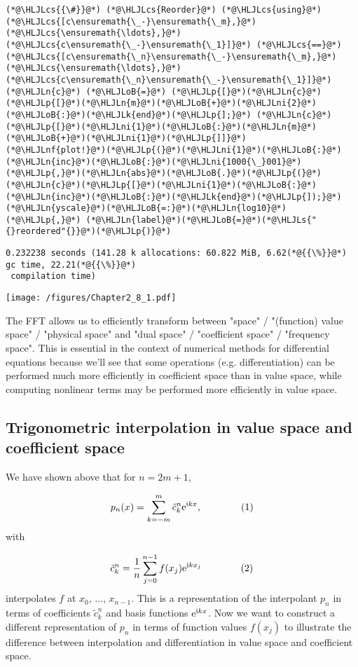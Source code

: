 \documentclass[12pt,a4paper]{article}
\newcommand{\HLJLk}[1]{\textcolor[RGB]{148,91,176}{\textbf{#1}}}
\newcommand{\HLJLn}[1]{#1}
\newcommand{\HLJLnf}[1]{\textcolor[RGB]{66,102,213}{#1}}
\newcommand{\HLJLs}[1]{\textcolor[RGB]{201,61,57}{#1}}
\newcommand{\HLJLni}[1]{\textcolor[RGB]{59,151,46}{#1}}
\newcommand{\HLJLoB}[1]{\textcolor[RGB]{102,102,102}{\textbf{#1}}}
\newcommand{\HLJLp}[1]{#1}
\newcommand{\HLJLcs}[1]{\textcolor[RGB]{153,153,119}{\textit{#1}}}
\begin{document}
\begin{lstlisting}
(*@\HLJLcs{{\#}}@*) (*@\HLJLcs{Reorder}@*) (*@\HLJLcs{using}@*) (*@\HLJLcs{[c\ensuremath{\_-}\ensuremath{\_m},}@*) (*@\HLJLcs{\ensuremath{\ldots},}@*) (*@\HLJLcs{c\ensuremath{\_-}\ensuremath{\_1}]}@*) (*@\HLJLcs{==}@*) (*@\HLJLcs{[c\ensuremath{\_n}\ensuremath{\_-}\ensuremath{\_m},}@*) (*@\HLJLcs{\ensuremath{\ldots},}@*) (*@\HLJLcs{c\ensuremath{\_n}\ensuremath{\_-}\ensuremath{\_1}]}@*)
(*@\HLJLn{c}@*) (*@\HLJLoB{=}@*) (*@\HLJLp{[}@*)(*@\HLJLn{c}@*)(*@\HLJLp{[}@*)(*@\HLJLn{m}@*)(*@\HLJLoB{+}@*)(*@\HLJLni{2}@*)(*@\HLJLoB{:}@*)(*@\HLJLk{end}@*)(*@\HLJLp{];}@*) (*@\HLJLn{c}@*)(*@\HLJLp{[}@*)(*@\HLJLni{1}@*)(*@\HLJLoB{:}@*)(*@\HLJLn{m}@*)(*@\HLJLoB{+}@*)(*@\HLJLni{1}@*)(*@\HLJLp{]]}@*)
(*@\HLJLnf{plot!}@*)(*@\HLJLp{(}@*)(*@\HLJLni{1}@*)(*@\HLJLoB{:}@*)(*@\HLJLn{inc}@*)(*@\HLJLoB{:}@*)(*@\HLJLni{1000{\_}001}@*)(*@\HLJLp{,}@*)(*@\HLJLn{abs}@*)(*@\HLJLoB{.}@*)(*@\HLJLp{(}@*)(*@\HLJLn{c}@*)(*@\HLJLp{[}@*)(*@\HLJLni{1}@*)(*@\HLJLoB{:}@*)(*@\HLJLn{inc}@*)(*@\HLJLoB{:}@*)(*@\HLJLk{end}@*)(*@\HLJLp{]);}@*) (*@\HLJLn{yscale}@*)(*@\HLJLoB{=:}@*)(*@\HLJLn{log10}@*)(*@\HLJLp{,}@*) (*@\HLJLn{label}@*)(*@\HLJLoB{=}@*)(*@\HLJLs{"{}reordered"{}}@*)(*@\HLJLp{)}@*)
\end{lstlisting}

\begin{lstlisting}
0.232238 seconds (141.28 k allocations: 60.822 MiB, 6.62(*@{{\%}}@*) gc time, 22.21(*@{{\%}}@*)
 compilation time)
\end{lstlisting}

\texttt{[image: /figures/Chapter2\_8\_1.pdf]}

The FFT allows us to efficiently transform between "space" / "(function) value space" / "physical space" and "dual space" / "coefficient space" / "frequency space".  This is essential in the context of numerical methods for differential equations because we'll see that some operations (e.g. differentiation) can be performed much more efficiently in coefficient space than in value space, while computing nonlinear terms may be performed more efficiently in value space.   

\subsection{Trigonometric interpolation in value space and coefficient space}
We have shown above that for $n = 2m+1$,

\[
p_n(x) = \sum_{k=-m}^{m} \tilde{c}^n_k{\rm e}^{{\rm i}kx},  \qquad \qquad (1)
\]
with

\[
\tilde{c}^n_k = \frac{1}{n}\sum_{j=0}^{n-1}f(x_j){\rm e}^{{\rm i}kx_j}  \qquad  \qquad (2)
\]
interpolates $f$ at $x_0$, $\ldots$, $x_{n-1}$. This is a representation of the interpolant $p_n$ in terms of coefficients $\tilde{c}^n_k$ and basis functions ${\rm e}^{{\rm i}kx}$.   Now we want to construct a different representation of $p_n$ in terms of function values $f(x_j)$ to illustrate the difference between interpolation and differentiation in value space and coefficient space. 
\end{document}
